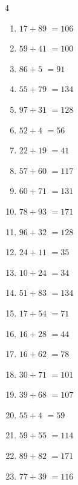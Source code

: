 \begin{multicols}{4}
\begin{enumerate}
  \item $17+89$
        $=106$

  \item $59+41$
        $=100$

  \item $86+5$
        $=91$

  \item $55+79$
        $=134$

\columnbreak %

\resetques

  \item $97+31$
        $=128$

  \item $52+4$
        $=56$

  \item $22+19$
        $=41$

  \item $57+60$
        $=117$

  \item $60+71$
        $=131$

  \item $78+93$
        $=171$

  \item $96+32$
        $=128$

  \item $24+11$
        $=35$

  \item $10+24$
        $=34$

  \item $51+83$
        $=134$

  \item $17+54$
        $=71$

  \item $16+28$
        $=44$

  \item $16+62$
        $=78$

  \item $30+71$
        $=101$

  \item $39+68$
        $=107$

  \item $55+4$
        $=59$

  \item $59+55$
        $=114$

  \item $89+82$
        $=171$

  \item $77+39$
        $=116$


\end{enumerate}
\end{multicols}
